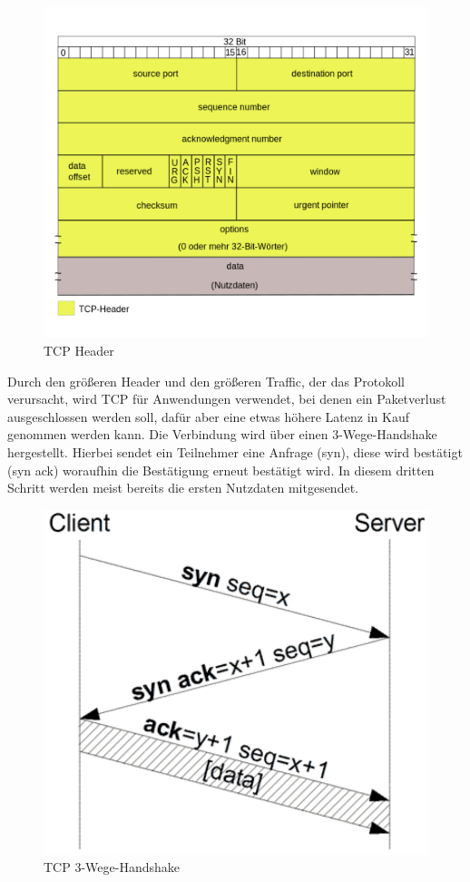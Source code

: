\begin{figure}[h]
	\centering
	\includegraphics[height=0.5\textheight]{images/TCP_header.pdf}
	\caption{TCP Header}
	\label{fig:tcp_header}
\end{figure}

Durch den größeren Header und den größeren Traffic, der das Protokoll verursacht, wird TCP für Anwendungen verwendet, bei denen ein Paketverlust ausgeschlossen werden soll, dafür aber eine etwas höhere Latenz in Kauf genommen werden kann. 
Die Verbindung wird über einen 3-Wege-Handshake hergestellt. Hierbei sendet ein Teilnehmer eine Anfrage (syn), diese wird bestätigt (syn ack) woraufhin die Bestätigung erneut bestätigt wird. In diesem dritten Schritt werden meist bereits die ersten Nutzdaten mitgesendet.
\begin{figure}[h]
	\centering
	\includegraphics[width=0.3\textheight]{images/TCP_3wayhandshake.pdf}
	\caption{TCP 3-Wege-Handshake}
	\label{fig:tcp_3wayhandshake}
\end{figure}

